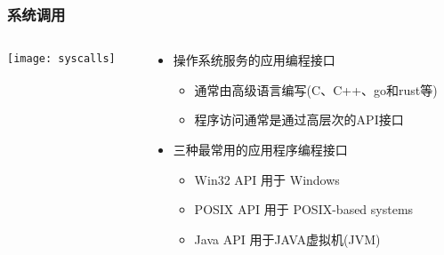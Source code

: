 \begin{frame}
	\frametitle{系统调用}


 	\begin{columns}
 	
 	\begin{column}{0.4\textwidth}
 		\centering
 		\texttt{[image: syscalls]}

 		
 	\end{column}
 	
 	\begin{column}{0.5\textwidth}
 		
    \begin{itemize}
        \item 操作系统服务的应用编程接口
	    \begin{itemize}
        	\item 通常由高级语言编写(C、C++、go和rust等)
        	\item 程序访问通常是通过高层次的API接口
    	\end{itemize}
        \item 三种最常用的应用程序编程接口
	    \begin{itemize}
        	\item Win32 API 用于 Windows
        	\item POSIX API 用于 POSIX-based systems
        	\item Java API 用于JAVA虚拟机(JVM)
    	\end{itemize}
    \end{itemize}

		\end{column}
\end{columns}

\end{frame}


